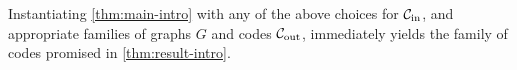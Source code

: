%
%
Instantiating \cref{thm:main-intro} with any of the above choices for ${\mathcal C}_{\mathrm{in}}$, and appropriate families of graphs $G$ and codes ${\mathcal C}_{\mathrm{out}}$, immediately yields the family of codes promised in \cref{thm:result-intro}.
%
%

%
\vspace{-10 pt}
